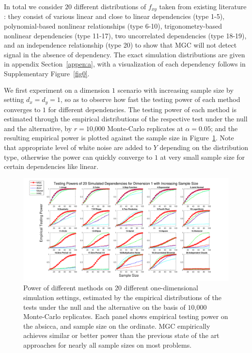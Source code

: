 \documentclass[11pt]{article}
\begin{document}

In total we consider $20$ different distributions of $f_{xy}$ taken from existing literature \cite{SzekelyRizzoBakirov2007, SimonTibshirani2012, GorfineHellerHeller2012, HellerGorfine2013}: they consist of various linear and close to linear dependencies (type 1-5), polynomial-based nonlinear relationships (type 6-10), trigonometry-based nonlinear dependencies (type 11-17), two uncorrelated dependencies (type 18-19), and an independence relationship (type 20) to show that MGC will not detect signal in the absence of dependency. The exact simulation distributions are given in appendix Section~\ref{appen:a}, with a visualization of each dependency follows in Supplementary Figure~\ref{fig0}.

We first experiment on a dimension $1$ scenario with increasing sample size by setting $d_{x}=d_{y}=1$, so as to observe how fast the testing power of each method converges to $1$ for different dependencies. The testing power of each method is estimated through the empirical distributions of the respective test under the null and the alternative, by $r=10$,$000$ Monte-Carlo replicates at $\alpha=0.05$; and the resulting empirical power is plotted against the sample size in Figure~\ref{fig:1D}. Note that appropriate level of white noise are added to $Y$ depending on the distribution type, otherwise the power can quickly converge to $1$ at very small sample size for certain dependencies like linear.

\begin{figure}[htbp]
\includegraphics[width=1.0\textwidth]{../Figures/Fig1}
\caption{
Power of different methods on 20 different one-dimensional simulation settings, estimated by the empirical distributions of the tests under the null and the alternative on the basis of $10$,$000$ Monte-Carlo replicates.
Each panel shows empirical testing power on the absicca, and sample size on the ordinate.
MGC empirically achieves similar or better power than the previous state of the art approaches for nearly all sample sizes on most problems.}
\label{fig:1D}
\end{figure}
\end{document}
